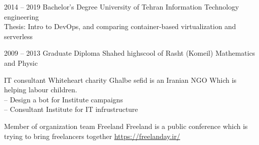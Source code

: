 \documentclass[9pt]{developercv}
\begin{document}

\begin{entrylist}
	\entry
	{2014 -- 2019}
	{Bachelor's Degree}
	{University of Tehran}
	{Information Technology engineering\\
		Thesis: Intro to DevOps, and comparing container-based virtualization and serverless
	}
\end{entrylist}

\begin{entrylist}
	\entry
	{2009 -- 2013}
	{Graduate Diploma}
	{Shahed highscool of Rasht (Komeil)}
	{Mathematics and Physic \\}
\end{entrylist}


\begin{entrylist}
	\entry
	{}
	{IT consultant}
	{Whiteheart charity}
	{Ghalbe sefid is an Iranian NGO Which is helping labour children. \\
		-- Design a bot for Institute campaigns \\
		-- Consultant Institute for IT infrustructure}
\end{entrylist}


\begin{entrylist}
	\entry
	{}
	{Member of organization team}
	{Freeland}
	{Freeland is a public conference which is trying to bring freelancers together
			{{\href{https://freelanday.ir/}{https://freelanday.ir/}}}
	}
\end{entrylist}
\end{document}
